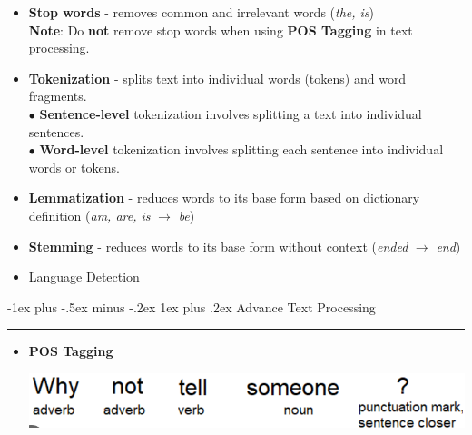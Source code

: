 \documentclass[letterpaper, 10.5pt,landscape]{article}
\makeatletter
\renewcommand{\subsubsection}{\@startsection{subsubsection}{3}{0mm}%
                                {-1ex plus -.5ex minus -.2ex}%
                                {1ex plus .2ex}%
                                {\normalfont\small\bfseries}}
\makeatother
\begin{document}
\begin{multicols*}{3}
\begin{itemize}[label={--},leftmargin=4mm]
\item \textbf{Stop words} - removes common and irrelevant words (\emph{the, is}) \\
\textbf{Note}: Do \textbf{not} remove stop words when using \textbf{POS Tagging} in text processing.
\vspace{-3pt}


\item \textbf{Tokenization} - splits text into individual words (tokens) and word fragments. \\
$\bullet$ \textbf{Sentence-level} tokenization involves splitting a text into individual sentences. \\
$\bullet$ \textbf{Word-level} tokenization involves splitting each sentence into individual words or tokens.
\vspace{-3pt}



\item \textbf{Lemmatization} - reduces words to its base form based on dictionary definition (\emph{am, are, is} $\to$ \emph{be})
\vspace{-3pt}

\item \textbf{Stemming} - reduces words to its base form without context (\emph{ended} $\to$ \emph{end})
\vspace{-3pt}

\item Language Detection
\vspace{-3pt}
\end{itemize}





\subsubsection{Advance Text Processing}  {\color{teal}\hrule height 0.5pt} \smallskip

\begin{itemize}[label={--},leftmargin=4mm]
\item \textbf{POS Tagging}


\vspace{-7pt}
\begin{center}
    \begin{minipage}{0.7\linewidth}
    \includegraphics[width=\textwidth]{figures/nlp_pos_tagging.png}
    \end{minipage}
\end{center}
\vspace{-7pt}


\end{itemize}
\end{multicols*}
\end{document}
